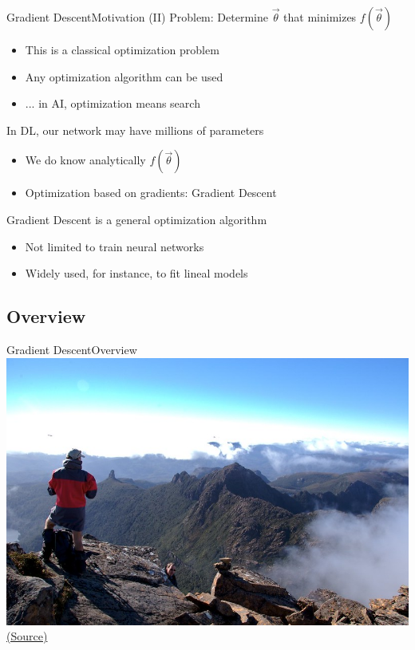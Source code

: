 \documentclass[10pt,compress]{beamer} %
\begin{document}
\begin{frame}{Gradient Descent}{Motivation (II)}
	Problem: Determine $\vec{\theta}$ that minimizes $f(\vec{\theta})$
	\begin{itemize}
		\item This is a classical optimization problem
		\item Any optimization algorithm can be used
		\item ... in AI, optimization means search
	\end{itemize}

	In DL, our network may have millions of parameters
	\begin{itemize}
		\item We do know analytically $f(\vec{\theta})$
		\item Optimization based on gradients: \alert{Gradient Descent}
	\end{itemize}
	Gradient Descent is a general optimization algorithm
	\begin{itemize}
		\item Not limited to train neural networks
		\item Widely used, for instance, to fit lineal models
	\end{itemize}
\end{frame}

\subsection{Overview}

{\blackSlide
\begin{frame}[plain]{Gradient Descent}{Overview}
	\centering\includegraphics[width=\linewidth]{figs/mountain.jpg}\\
	\scriptsize\href{https://flickr.com/photos/pnglife/2362494258/in/photolist-8vGnwi-Mp7XNw-ozKpZv-4ALpeC-axW8KB-23DBJYt-frJNKt-yzPoCX-4LqDab-axf3zv-or4KtC-oqHW4q-axf5yp-23YRq9h-VNJWrs-8McrVM-dNbJXY-5sDfpy-o3SjX-qF1rGP-cfAqTh-YhNXcj-pECdqe-cfAqLE-BRziN1-22w1wBv-6rR9NW-f5iic4-82Vd2C-hzy676-HG1zW6-pT8N-RDfrcf-axf8x8-WKv575-w9JSfr-pT4H-bNwyCT-Cxjb7-bUef42-frJQ4v-Am2QCd-axXouW-axhMph-VqaQum-g78JD3-qtRE5V-egjam3-f9YgJ4-SVGSpe/}{(Source)}
\end{frame}
}
\end{document}
